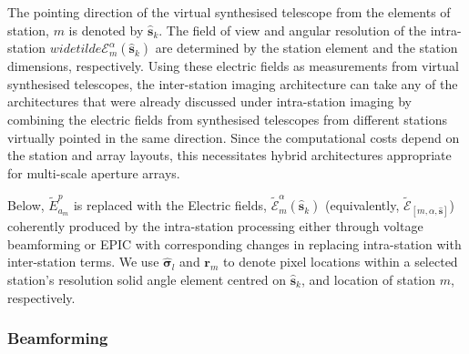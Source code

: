 \documentclass[
  journal=pasa,
  manuscript=article-type,
  year=2020,
  volume=37,
]{cup-journal}
\begin{document}
The pointing direction of the virtual synthesised telescope from the elements of station, $m$ is denoted by $\hat{\boldsymbol{s}}_k$. The field of view and angular resolution of the intra-station $widetilde{\mathcal{E}}_m^\alpha(\hat{\boldsymbol{s}}_k)$ are determined by the station element and the station dimensions, respectively. Using these electric fields as measurements from virtual synthesised telescopes, the inter-station imaging architecture can take any of the architectures that were already discussed under intra-station imaging by combining the electric fields from synthesised telescopes from different stations virtually pointed in the same direction. Since the computational costs depend on the station and array layouts, this necessitates hybrid architectures appropriate for multi-scale aperture arrays. 

Below, $\widetilde{E}_{a_m}^p$ is replaced with the Electric fields, $\widetilde{\mathcal{E}}_m^\alpha(\hat{\boldsymbol{s}}_k)$ (equivalently,  $\widetilde{\boldsymbol{\mathcal{E}}}_{[m,\alpha,\hat{\boldsymbol{s}}]}$) coherently produced by the intra-station processing either through voltage beamforming or EPIC with corresponding changes in replacing intra-station with inter-station terms. We use $\hat{\boldsymbol{\sigma}}_l$ and $\boldsymbol{r}_{m}$ to denote pixel locations within a selected station's resolution solid angle element centred on $\hat{\boldsymbol{s}}_k$, and location of station $m$, respectively. 

\subsubsection{Beamforming}
\end{document}
